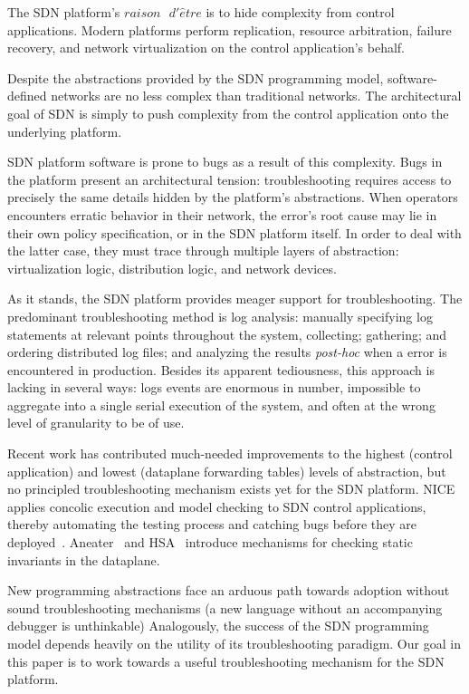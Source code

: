 The SDN platform's $raison\text{ }d'\hat{e}tre$ is to 
hide complexity from control applications. Modern platforms perform
replication, resource arbitration, failure recovery, and network 
virtualization on the control application's behalf. 

Despite the abstractions provided by the SDN programming model,
software-defined networks are no less complex than traditional networks.
The architectural goal of SDN is
simply to push complexity from the control application onto
the underlying platform.

SDN platform software is prone to bugs as a result of this complexity.
Bugs in the
platform present an architectural tension: troubleshooting requires
access to precisely the same details hidden by the platform's abstractions.
When operators encounters erratic behavior in their network, the error's root
cause may lie in their own policy specification, or in the SDN platform
itself. In order to deal with the latter case, they must trace through
multiple layers of abstraction: virtualization logic, distribution logic, and
network devices.

As it stands, the SDN platform provides meager support for troubleshooting.
The predominant troubleshooting method is log analysis: manually
specifying log statements at relevant points throughout the system,
collecting; gathering; and ordering distributed log files; and analyzing the
results {\it post-hoc} when a error is encountered in production. Besides its
apparent tediousness, this approach is lacking in several ways: logs events
are enormous in number, impossible to aggregate into a single serial
execution of the system, and often at the wrong level of granularity to be of
use. 

Recent work has contributed much-needed improvements to the highest (control
application) and lowest (dataplane forwarding tables) levels of abstraction, 
but no principled troubleshooting mechanism exists yet for the SDN platform.
NICE applies concolic execution and model checking to SDN control
applications, thereby automating the testing process and catching bugs before
they are deployed~\cite{nice}. Aneater~\cite{anteater} and HSA~\cite{hsa}
introduce mechanisms for checking static invariants in the dataplane.

New programming abstractions face an arduous path towards adoption
without sound troubleshooting mechanisms (\eg a new language
without an accompanying debugger is unthinkable) Analogously, the success of the
SDN programming model depends heavily on the utility of its troubleshooting
paradigm. Our goal in this paper is to work towards a useful
troubleshooting mechanism for the SDN platform. 

